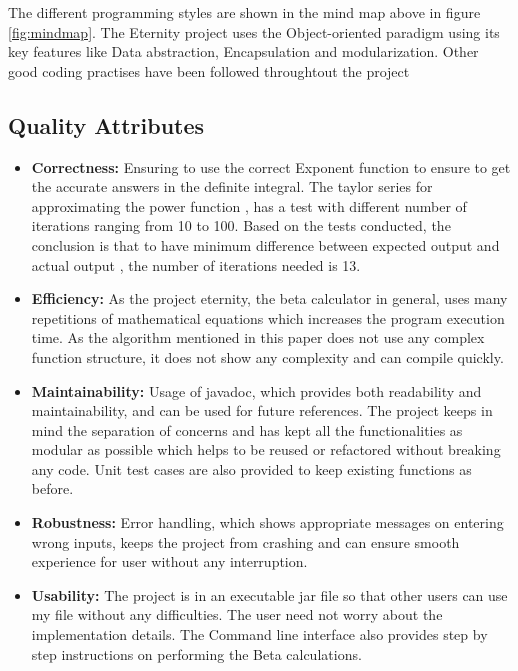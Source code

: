 \documentclass[letterpaper, 11pt]{article}
\begin{document}
    The different programming styles are shown in the mind map above in figure \ref{fig:mindmap}. The Eternity project uses the Object-oriented paradigm using its key features like Data abstraction, Encapsulation and modularization. 
    Other good coding practises have been followed throughtout the project

    
    \subsection{Quality Attributes}
        \begin{itemize}
          \item \textbf{Correctness:} Ensuring to use the correct Exponent function to ensure to get the accurate answers in the definite integral.
          The taylor series for approximating the power function , has a test with different number of iterations ranging from 10 to 100. Based on the tests conducted, the  conclusion is  that to have minimum difference between expected output and actual output , the number of iterations needed is 13.
          \item \textbf{Efficiency:} As the project eternity, the beta calculator in general, uses  many repetitions of mathematical equations which increases the program execution time. As the algorithm mentioned in this paper does not use any complex function structure, it does not show any complexity and can compile quickly.
          \item \textbf{Maintainability:} Usage of javadoc, which provides both readability and maintainability,  and can be used for future references. The project keeps in mind the separation of concerns and has kept all the functionalities as modular as possible which helps to be reused or refactored without breaking any code. Unit test cases are also provided to keep existing functions as before.
          \item \textbf{Robustness:} Error handling, which shows appropriate messages on entering wrong inputs, keeps the project from crashing and can ensure smooth experience for user without any interruption.
          \item \textbf{Usability:} The project is in an executable jar file so that other users can use my file without any difficulties. The user need not worry about the implementation details. The Command line interface also provides step by step instructions on performing the Beta calculations.
        \end{itemize}
  
\end{document}
